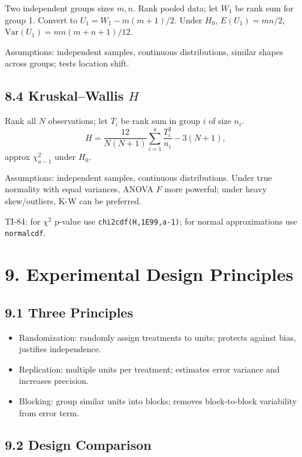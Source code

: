 \documentclass[9pt,letterpaper]{article}
\begin{document}
Two independent groups sizes $m,n$. Rank pooled data; let $W_1$ be rank sum for group 1. Convert to $U_1=W_1-m(m+1)/2$. Under $H_0$, $E(U_1)=mn/2$, $\text{Var}(U_1)=mn(m+n+1)/12$.

Assumptions: independent samples, continuous distributions, similar shapes across groups; tests location shift.

\subsection{8.4 Kruskal--Wallis $H$}

Rank all $N$ observations; let $T_i$ be rank sum in group $i$ of size $n_i$.
\[
H=\frac{12}{N(N+1)}\sum_{i=1}^a\frac{T_i^2}{n_i}-3(N+1),
\]
approx $\chi^2_{a-1}$ under $H_0$.

Assumptions: independent samples, continuous distributions. Under true normality with equal variances, ANOVA $F$ more powerful; under heavy skew/outliers, K-W can be preferred.

\begin{calcbox}
TI-84: for $\chi^2$ p-value use \texttt{chi2cdf(H,1E99,a-1)}; for normal approximations use \texttt{normalcdf}.
\end{calcbox}

\section{9. Experimental Design Principles}

\subsection{9.1 Three Principles}

\begin{itemize}
    \item Randomization: randomly assign treatments to units; protects against bias, justifies independence.
    \item Replication: multiple units per treatment; estimates error variance and increases precision.
    \item Blocking: group similar units into blocks; removes block-to-block variability from error term.
\end{itemize}

\subsection{9.2 Design Comparison}
\end{document}

